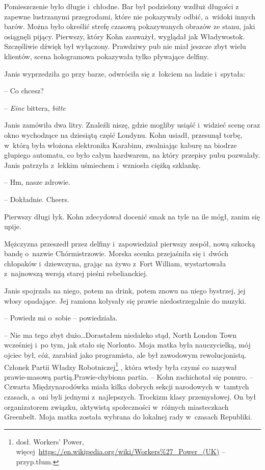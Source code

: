 \documentclass[oneside,polish,11pt,sfheadings]{mwbk}
\begin{document}
Pomieszczenie było długie i~chłodne. Bar był podzielony wzdłuż długości
z zapewne lustrzanymi przegrodami, które nie pokazywały odbić, a~widoki
innych barów. Można było określić strefę czasową pokazywanych obrazów ze
stanu, jaki osiągnęli pijący. Pierwszy, który Kohn zauważył, wyglądał
jak Władywostok. Szczęśliwie dźwięk był wyłączony. Prawdziwy pub nie
miał jeszcze zbyt wielu klientów, scena hologramowa pokazywała tylko
pływające delfiny.

Janis wyprzedziła go przy barze, odwróciła się z~łokciem na ladzie i~spytała: 

-- Co chcesz?

-- \emph{Eine} bittera, \emph{bitte}

Janis zamówiła dwa litry. Znaleźli niszę, gdzie mogliby usiąść i~widzieć
scenę oraz okno wychodzące na dziesiątą część Londynu. Kohn usiadł,
przesunął torbę, w~którą była włożona elektronika Karabinu, zwalniając
kaburę na biodrze głupiego automatu, co było całym hardwarem, na który
przepisy pubu pozwalały. Janis patrzyła z~lekkim uśmiechem i~wzniosła
ciężką szklankę.

-- Hm, nasze zdrowie.

-- Dokładnie. Cheers.

Pierwszy długi łyk. Kohn zdecydował docenić smak na tyle na ile mógł,
zanim się upije.

Mężczyzna przeszedł przez delfiny i~zapowiedział pierwszy zespół, nową
szkocką bandę o~nazwie Chórmistrzowie. Morska scenka przejaśniła się i~dwóch chłopaków i~dziewczyna, grając na żywo z~Fort William,
wystartowała z~najnowszą wersją starej pieśni rebelianckiej.

Janis spojrzała na niego, potem na drink, potem znowu na niego bystrzej,
jej włosy opadające. Jej ramiona kołysały się prawie niedostrzegalnie do
muzyki.

-- Powiedz mi o~sobie -- powiedziała.

-- Nie ma tego zbyt dużo\ldots Dorastałem niedaleko stąd, North London Town
wcześniej i~po tym, jak stało się Norlonto. Moja matka była
nauczycielką, mój ojciec był, cóż, zarabiał jako programista, ale był
zawodowym rewolucjonistą. Członek Partii Władzy Robotniczej\footnote{dosł. Workers' Power, więcej~\url{https://en.wikipedia.org/wiki/Workers\%27\_Power\_(UK)}
-- przyp.tłum.} , która wtedy
była czymś co nazywał prawie-masową partią.Prawie-chybiona partia. -- Kohn zachichotał się ponuro. -- Czwarta Międzynarodówka miała kilka dobrych sekcji narodowych w~tamtych
czasach, a~oni byli jednymi z~najlepszych. Trockizm klasy przemysłowej.
On był organizatorem związku, aktywistą społeczności w~różnych
miasteczkach Greenbelt. Moja matka została wybrana do lokalnej rady w~czasach Republiki.
\end{document}
